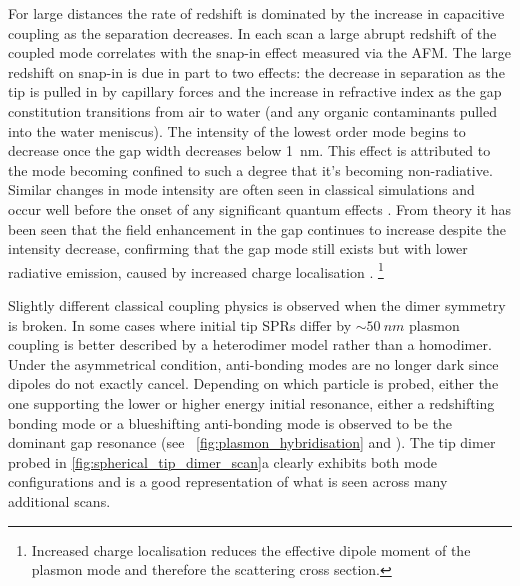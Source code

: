 \documentclass[a4paper]{article}
\begin{document}
For large distances the rate of redshift is dominated by the increase in capacitive coupling as the separation decreases. In each scan a large abrupt redshift of the coupled mode correlates with the snap-in effect measured via the AFM. The large redshift on snap-in is due in part to two effects: the decrease in separation as the tip is pulled in by capillary forces and the increase in refractive index as the gap constitution transitions from air to water (and any organic contaminants pulled into the water meniscus). The intensity of the lowest order mode begins to decrease once the gap width decreases below \SI{1}{nm}. This effect is attributed to the mode becoming confined to such a degree that it's becoming non-radiative. Similar changes in mode intensity are often seen in classical simulations and occur well before the onset of any significant quantum effects \cite{savage2012, esteban2015}.
{\color{red}From theory it has been seen that the field enhancement in the gap continues to increase despite the intensity decrease, confirming that the gap mode still exists but with lower radiative emission, caused by increased charge localisation \cite{esteban2012}.%
\footnote{Increased charge localisation reduces the effective dipole moment of the plasmon mode and therefore the scattering cross section.}}


Slightly different classical coupling physics is observed when the dimer symmetry is broken. In some cases where initial tip SPRs differ by $\sim\SI{50}{nm}$ plasmon coupling is better described by a heterodimer model rather than a homodimer. Under the asymmetrical condition, anti-bonding modes are no longer dark since dipoles do not exactly cancel. Depending on which particle is probed, either the one supporting the lower or higher energy initial resonance, either a redshifting bonding mode or a blueshifting anti-bonding mode is observed to be the dominant gap resonance (see \figurename~\ref{fig:plasmon_hybridisation} and \cite{nordlander2004}). The tip dimer probed in \autoref{fig:spherical_tip_dimer_scan}a clearly exhibits both mode configurations and is a good representation of what is seen across many additional scans.
\end{document}
